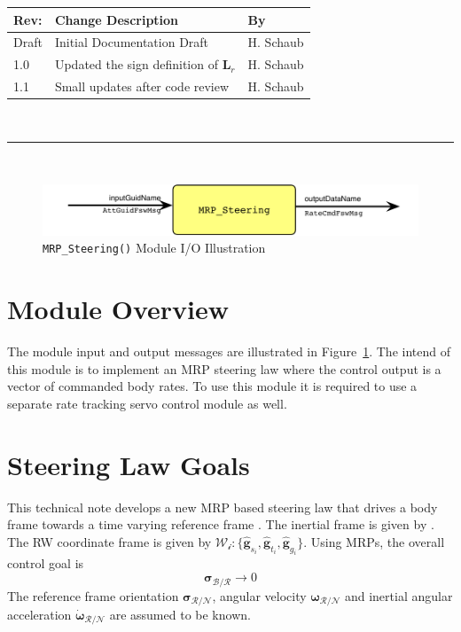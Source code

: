 \documentclass[]{BasiliskReportMemo}
\begin{document}
\makeCover


%
%
\pagestyle{empty}
{\renewcommand{\arraystretch}{2}
\noindent
\begin{longtable}{|p{0.5in}|p{4.5in}|p{1.14in}|}
\hline
{\bfseries Rev}: & {\bfseries Change Description} & {\bfseries By} \\
\hline
Draft & Initial Documentation Draft & H. Schaub \\
1.0 & Updated the sign definition of $\bm L_{r}$ & H. Schaub \\
1.1 & Small updates after code review & H. Schaub \\
\hline

\end{longtable}
}

\newpage
\setcounter{page}{1}
\pagestyle{fancy}

\tableofcontents
~\\ \hrule ~\\



\begin{figure}[htb]
	\centerline{
	\includegraphics[]{Figures/moduleImg}
	}
	\caption{{\tt MRP\_Steering()} Module I/O Illustration}
	\label{fig:moduleIO}
\end{figure}
\section{Module Overview}
The module input and output messages are illustrated in Figure~\ref{fig:moduleIO}.  The intend of this module is to implement an MRP steering law where the control output is a vector of commanded body rates.  To use this module it is required to use a separate rate tracking servo control module as well.  


\section{Steering Law Goals}
This technical note develops a new MRP based steering law that drives a body frame  towards a time varying reference frame . The inertial frame is given by .   The RW coordinate frame is given by $\mathcal{W_{i}}:\{ \hat{\bm g}_{s_{i}}, \hat{\bm g}_{t_{i}}, \hat{\bm g}_{g_{i}} \}$.  Using MRPs, the overall control goal is 
\begin{equation}
	\label{eq:MS:1}
	\bm\sigma_{\mathcal{B}/\mathcal{R}} \rightarrow 0
\end{equation}
The reference frame orientation $\bm \sigma_{\mathcal{R}/\mathcal{N}}$, angular velocity $\bm\omega_{\mathcal{R}/\mathcal{N}}$ and inertial angular acceleration $\dot{\bm \omega}_{\mathcal{R}/\mathcal{N}}$ are assumed to be known. 
\end{document}
